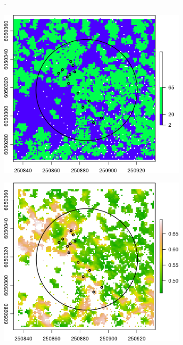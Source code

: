 \documentclass{subfiles}
\begin{document}
\begin{figure} [h!]
\begin{subfigure}[t]{.49\textwidth}
 		\caption{.} 
 		\label{fig:c5_heightHist}
 	\end{subfigure} \hfill
 	\begin{subfigure}[t]{.49\textwidth}
 		\centering
 		\includegraphics[width=\textwidth]{img/dead/c6_groundThres}
 		\caption{} 
 		\label{fig:c6_groundMask}
 	\end{subfigure}
 	\begin{subfigure}[t]{.49\textwidth}
 		\centering
 		\includegraphics[width=\textwidth]{img/dead/c7_groundRemoved}
 		\caption{} 
 		\label{fig:c7_groundRemoved}
 	\end{subfigure}
 	\caption{ }  
 	\label{fig:GroundPixelsRemoval} 
 \end{figure}
 
\end{document}
